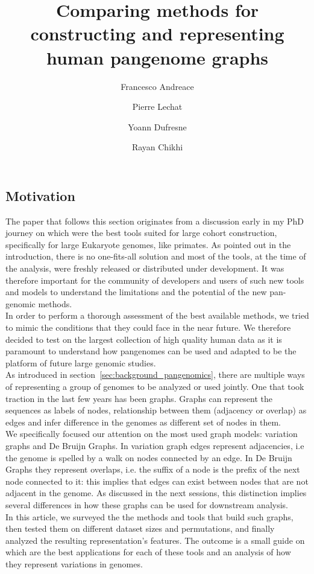 \subsection*{Motivation}
The paper that follows this section originates from a discussion early in my PhD journey on which were the best tools suited for large cohort \pangenome construction, specifically for large 
Eukaryote genomes, like primates. As pointed out in the introduction, there is no one-fits-all solution and most of the tools, at the time of the analysis, were freshly released or distributed under development. It was therefore important for the community of developers and users of such new tools and models to understand the limitations and the potential of the new pan-genomic methods.\\
In order to perform a thorough assessment of the best available methods, we tried to mimic the conditions that they could face in the near future. We therefore decided to test on the largest collection of high quality human data as it is paramount to understand how pangenomes can be used and adapted to be the platform of future large genomic studies.\\
As introduced in section~\ref{sec:background_pangenomics}, there are multiple ways of representing a group of genomes to be analyzed or used jointly. One that took traction in the last few years has been graphs. Graphs can represent the sequences as labels of nodes, relationship between them (adjacency or overlap) as edges and infer difference in the genomes as different set of nodes in them.\\
We specifically focused our attention on the most used graph models: variation graphs and De Bruijn Graphs. In variation graph edges represent adjacencies, i.e the genome is spelled by a walk on nodes connected by an edge. In De Bruijn Graphs they represent overlaps, i.e. the suffix of a node is the prefix of the next node connected to it: this implies that edges can exist between nodes that are not adjacent in the genome. As discussed in the next sessions, this distinction implies several differences in how these graphs can be used for downstream analysis. \\ 
In this article, we surveyed the the methods and tools that build such graphs, then tested them on different dataset sizes and permutations, and finally analyzed the resulting representation's features. The outcome is a small guide on which are the best applications for each of these tools and an analysis of how they represent variations in genomes. \\
\newpage
\author
{
	Francesco Andreace
	\and
	Pierre Lechat
	\and
	Yoann Dufresne
	\and
	Rayan Chikhi
}
\title{Comparing methods for constructing and representing human pangenome graphs}

